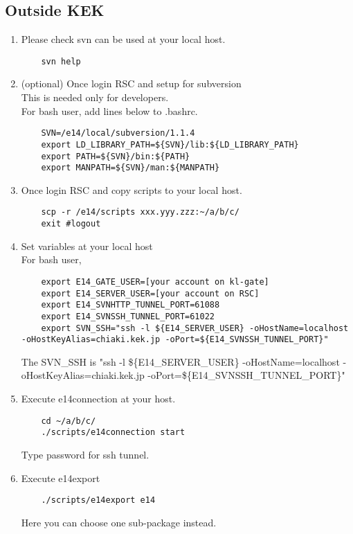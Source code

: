 \documentclass[a4paper,12pt]{article}
\begin{document}
  \subsection{Outside KEK}
  \begin{enumerate}
   \item Please check svn can be used at your local host.\\
	 \begin{verbatim}
	svn help
	\end{verbatim}	
   \item (optional) Once login RSC and setup for subversion\\
	 This is needed only for developers.\\
	 For bash user, 
           add lines below to .bashrc.
	 \begin{verbatim}
	SVN=/e14/local/subversion/1.1.4
	export LD_LIBRARY_PATH=${SVN}/lib:${LD_LIBRARY_PATH}
	export PATH=${SVN}/bin:${PATH}
	export MANPATH=${SVN}/man:${MANPATH}	
	 \end{verbatim}
   \item Once login RSC and copy scripts to your local host.
	 \begin{verbatim}
	scp -r /e14/scripts xxx.yyy.zzz:~/a/b/c/
	exit #logout
	 \end{verbatim}
   \item Set variables at your local host\\
	 For bash user,
	 \begin{verbatim}
	export E14_GATE_USER=[your account on kl-gate]
	export E14_SERVER_USER=[your account on RSC]
	export E14_SVNHTTP_TUNNEL_PORT=61088
	export E14_SVNSSH_TUNNEL_PORT=61022
	export SVN_SSH="ssh -l ${E14_SERVER_USER} -oHostName=localhost -oHostKeyAlias=chiaki.kek.jp -oPort=${E14_SVNSSH_TUNNEL_PORT}"
	 \end{verbatim}
	 The SVN\_SSH is "ssh -l \$\{E14\_SERVER\_USER\}
	 -oHostName=localhost -oHostKeyAlias=chiaki.kek.jp
	 -oPort=\$\{E14\_SVNSSH\_TUNNEL\_PORT\}"\\
   \item Execute e14connection at your host.
	 \begin{verbatim}
	cd ~/a/b/c/
	./scripts/e14connection start
	 \end{verbatim}
	 Type password for ssh tunnel.
   \item Execute e14export
	 \begin{verbatim}
	./scripts/e14export e14
	 \end{verbatim}
	 Here you can choose one sub-package instead.

\end{enumerate}
\end{document}
